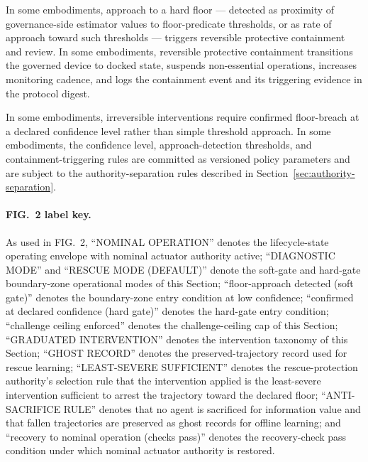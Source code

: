 \documentclass[a4paper,12pt]{article}
\begin{document}
In some embodiments, approach to a hard floor --- detected as
proximity of governance-side estimator values to floor-predicate
thresholds, or as rate of approach toward such thresholds --- triggers
reversible protective containment and review. In some embodiments,
reversible protective containment transitions the governed device to
docked state, suspends non-essential operations, increases monitoring
cadence, and logs the containment event and its triggering evidence in
the protocol digest.

In some embodiments, irreversible interventions require confirmed
floor-breach at a declared confidence level rather than simple
threshold approach. In some embodiments, the confidence level,
approach-detection thresholds, and containment-triggering rules are
committed as versioned policy parameters and are subject to the
authority-separation rules described in
Section~\ref{sec:authority-separation}.


\paragraph{FIG.~2 label key.}
As used in FIG.~2, ``NOMINAL OPERATION'' denotes the lifecycle-state
operating envelope with nominal actuator authority active;
``DIAGNOSTIC MODE'' and ``RESCUE MODE (DEFAULT)'' denote the
soft-gate and hard-gate boundary-zone operational modes of this
Section; ``floor-approach detected (soft gate)'' denotes the
boundary-zone entry condition at low confidence;
``confirmed at declared confidence (hard gate)'' denotes the
hard-gate entry condition; ``challenge ceiling enforced'' denotes the
challenge-ceiling cap of this Section; ``GRADUATED INTERVENTION''
denotes the intervention taxonomy of this Section; ``GHOST RECORD''
denotes the preserved-trajectory record used for rescue learning;
``LEAST-SEVERE SUFFICIENT'' denotes the rescue-protection authority's
selection rule that the intervention applied is the least-severe
intervention sufficient to arrest the trajectory toward the declared
floor; ``ANTI-SACRIFICE RULE'' denotes that no agent is sacrificed
for information value and that fallen trajectories are preserved as
ghost records for offline learning; and ``recovery to nominal
operation (checks pass)'' denotes the recovery-check pass condition
under which nominal actuator authority is restored.
\end{document}
